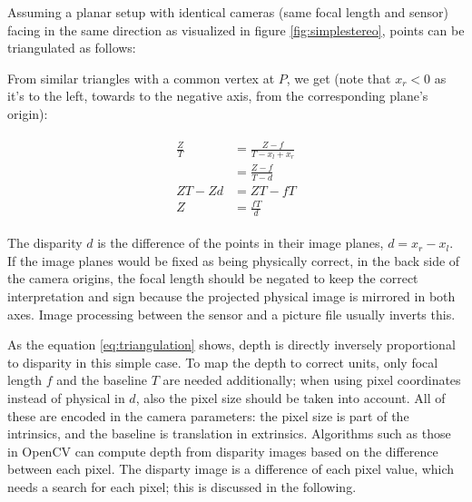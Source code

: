 
Assuming a planar setup with identical cameras (same focal length and sensor) facing in the same direction as visualized in figure \ref{fig:simplestereo}, points can be triangulated as follows:

From similar triangles with a common vertex at $P$, we get (note that $x_r < 0$ as it's to the left, towards to the negative axis, from the corresponding plane's origin):

\begin{align} \label{eq:triangulation} \begin{split}
	\frac{Z}{T} &= \frac{Z-f}{T - x_l + x_r} \\
	&= \frac{Z-f}{T - d}\\
	ZT - Zd &= ZT - fT\\
	Z &= \frac{fT}{d}
\end{split} \end{align}

The disparity $d$ is the difference of the points in their image planes, $d = x_r - x_l$.
If the image planes would be fixed as being physically correct, in the back side of the camera origins, the focal length should be negated to keep the correct interpretation and sign because the projected physical image is mirrored in both axes. Image processing between the sensor and a picture file usually inverts this.

As the equation \ref{eq:triangulation} shows, depth is directly inversely proportional to disparity in this simple case.
To map the depth to correct units, only focal length $f$ and the baseline $T$ are needed additionally; when using pixel coordinates instead of physical in $d$, also the pixel size should be taken into account.
All of these are encoded in the camera parameters: the pixel size is part of the intrinsics, and the baseline is translation in extrinsics.
Algorithms such as those in OpenCV \cite{opencv} can compute depth from disparity images based on the difference between each pixel.
The disparty image is a difference of each pixel value, which needs a search for each pixel;
this is discussed in the following.

